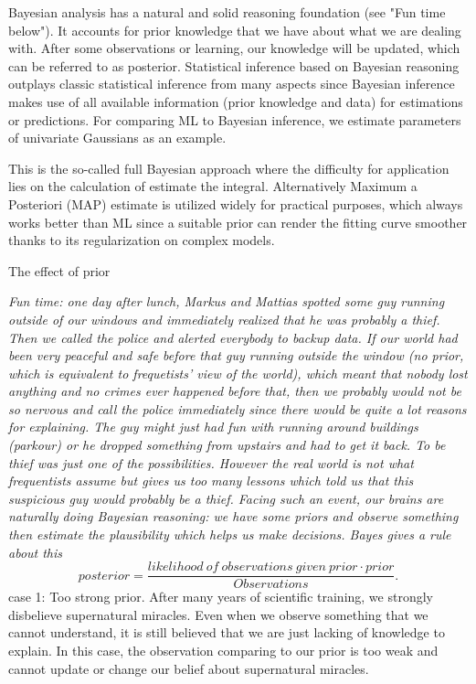 \documentclass[paper=a4, fontsize=12pt]{scrartcl}	%
\numberwithin{equation}{section}					%
\numberwithin{figure}{section}					%
\numberwithin{table}{section}					%
\begin{document}
Bayesian analysis has a natural and solid reasoning foundation (see "Fun time below"). It accounts for prior knowledge that we have about what we are dealing with. After some observations or learning, our knowledge will be updated, which can be referred to as posterior. Statistical inference based on Bayesian reasoning outplays classic statistical inference from many aspects since Bayesian inference makes use of all available information (prior knowledge and data) for estimations or predictions. For comparing ML to Bayesian inference, we estimate parameters of univariate Gaussians as an example. 


This is the so-called full Bayesian approach where the difficulty for application lies on the calculation of estimate the integral. Alternatively Maximum a Posteriori (MAP) estimate is utilized widely for practical purposes, which always works better than ML since a suitable prior can render the fitting curve smoother thanks to its regularization on complex models. 


The effect of prior


{\it Fun time: one day after lunch, Markus and Mattias spotted some guy running outside of our windows and immediately realized that he was probably a thief. Then we called the police and alerted everybody to backup data. If our world had been very peaceful and safe before that guy running outside the window (no prior, which is equivalent to frequetists' view of the world), which meant that nobody lost anything and no crimes ever happened before that, then we probably would not be so nervous and call the police immediately since there would be quite a lot reasons for explaining. The guy might just had fun with running around buildings (parkour) or he dropped something from upstairs and had to get it back. To be thief was just one of the possibilities. However the real world is not what frequentists assume but gives us too many lessons which told us that this suspicious guy would probably be a thief. Facing such an event, our brains are naturally doing Bayesian reasoning: we have some priors and observe something then estimate the plausibility which helps us make decisions. Bayes gives a rule about this 
\begin{equation}
posterior = \frac{likelihood\ of\ observations\ given\ prior\cdot prior}{Observations}.
\end{equation}}
case 1: Too strong prior. After many years of scientific training, we strongly disbelieve supernatural miracles. Even when we observe something that we cannot understand, it is still believed that we are just lacking of knowledge to explain. In this case, the observation comparing to our prior is too weak and cannot update or change our belief about supernatural miracles. 
\end{document}
